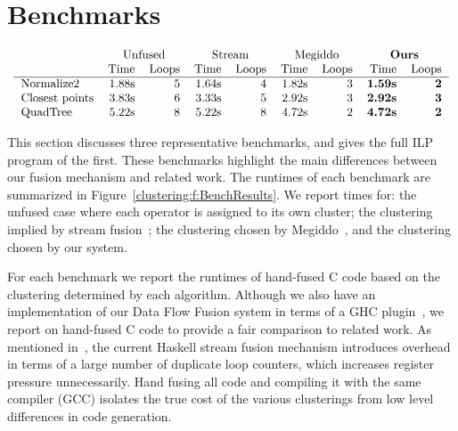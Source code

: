 \section{Benchmarks}
\label{clustering:s:Benchmarks}

\begin{figure*}
$$\begin{array}{c}

\begin{tabular}{lrrrrrrrr}
                & \multicolumn{2}{c}{Unfused}         & \multicolumn{2}{c}{Stream}
                & \multicolumn{2}{c}{Megiddo} &\multicolumn{2}{c}{\textbf{Ours}} \\
                & Time & Loops   & Time & Loops      & Time & Loops & Time & Loops   \\
\hline
Normalize2      & 1.88s & 5      & 1.64s & 4          & 1.82s & 3  & \textbf{1.59s} & \textbf{2}\\
Closest points  & 3.83s & 6      & 3.33s & 5          & 2.92s & 3  & \textbf{2.92s} & \textbf{3}\\
QuadTree        & 5.22s & 8      & 5.22s & 8          & 4.72s & 2  & \textbf{4.72s} & \textbf{2}\\
\end{tabular}

\end{array}$$
\caption{Benchmark results}
\label{clustering:f:BenchResults}
\end{figure*}

This section discusses three representative benchmarks, and gives the full ILP program of the first. These benchmarks highlight the main differences between our fusion mechanism and related work. The runtimes of each benchmark are summarized in Figure~\ref{clustering:f:BenchResults}. We report times for: the unfused case where each operator is assigned to its own cluster; the clustering implied by stream fusion~\cite{coutts2007stream}; the clustering chosen by Megiddo~\cite{megiddo1998optimal}, and the clustering chosen by our system. 

For each benchmark we report the runtimes of hand-fused C code based on the clustering determined by each algorithm. Although we also have an implementation of our Data Flow Fusion system in terms of a GHC plugin~\cite{lippmeier2013data}, we report on hand-fused C code to provide a fair comparison to related work. As mentioned in~\cite{lippmeier2013data}, the current Haskell stream fusion mechanism introduces overhead in terms of a large number of duplicate loop counters, which increases register pressure unnecessarily. Hand fusing all code and compiling it with the same compiler (GCC) isolates the true cost of the various clusterings from low level differences in code generation.

